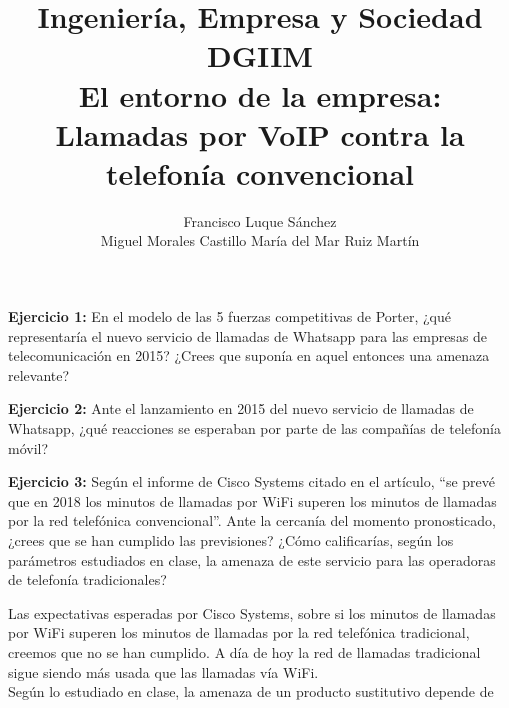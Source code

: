\documentclass[11pt]{article}
\theoremstyle{plain}
\theoremstyle{definition}
\begin{document}
\title{Ingeniería, Empresa y Sociedad \\
  DGIIM \\
  \large El entorno de la empresa: Llamadas por VoIP contra la
  telefonía convencional }
\author{Francisco Luque Sánchez\\
  Miguel Morales Castillo María del Mar Ruiz Martín}

\maketitle

\textbf{Ejercicio 1:} En el modelo de las 5 fuerzas competitivas de
Porter, ¿qué representaría el nuevo servicio de llamadas de Whatsapp
para las empresas de telecomunicación en 2015? ¿Crees que suponía en
aquel entonces una amenaza relevante?

\textbf{Ejercicio 2:} Ante el lanzamiento en 2015 del nuevo servicio
de llamadas de Whatsapp, ¿qué reacciones se esperaban por parte de las
compañías de telefonía móvil?

\textbf{Ejercicio 3:} Según el informe de Cisco Systems citado en el
artículo, ``se prevé que en 2018 los minutos de llamadas por WiFi
superen los minutos de llamadas por la red telefónica
convencional''. Ante la cercanía del momento pronosticado, ¿crees que
se han cumplido las previsiones? ¿Cómo calificarías, según los
parámetros estudiados en clase, la amenaza de este servicio para las
operadoras de telefonía tradicionales?

Las expectativas esperadas por Cisco Systems, sobre si los minutos de
llamadas por WiFi superen los minutos de llamadas por la red telefónica
tradicional, creemos que no se han cumplido. A día de hoy la red de
llamadas tradicional sigue siendo más usada que las llamadas vía WiFi.\\

Según lo estudiado en clase, la amenaza de un producto sustitutivo
depende de

\printbibliography
\end{document}
